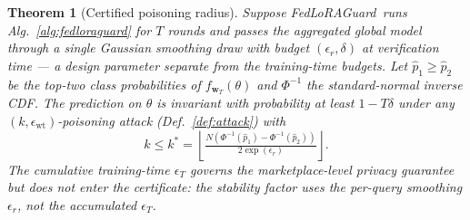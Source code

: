 \documentclass[11pt]{article}
\theoremstyle{plain}
\newtheorem{theorem}{Theorem}
\theoremstyle{definition}
\theoremstyle{remark}
\newcommand{\modelname}{FedLoRAGuard}
\begin{document}
\begin{theorem}[Certified poisoning radius]
\label{thm:certified}
Suppose \modelname\ runs Alg.~\ref{alg:fedloraguard} for $T$
rounds and passes the aggregated global model through a single
Gaussian smoothing draw with budget $(\epsilon_r,\delta)$ at
verification time --- a design parameter separate from the
training-time budgets. Let $\hat{p}_1\!\ge\!\hat{p}_2$ be the
top-two class probabilities of $f_{\mathbf{w}_T}(\theta)$ and
$\Phi^{-1}$ the standard-normal inverse CDF. The prediction on
$\theta$ is invariant with probability at least $1-T\delta$ under
any $(k,\epsilon_{\mathrm{wt}})$-poisoning attack
(Def.~\ref{def:attack}) with
\begin{equation}
k \le k^* = \left\lfloor \tfrac{N (\Phi^{-1}(\hat{p}_1) - \Phi^{-1}(\hat{p}_2))}{2 \exp(\epsilon_r)} \right\rfloor.
\label{eq:kstar}
\end{equation}
The cumulative training-time $\epsilon_T$ governs the
marketplace-level privacy guarantee but does \emph{not} enter the
certificate: the stability factor uses the per-query smoothing
$\epsilon_r$, not the accumulated $\epsilon_T$.
\end{theorem}
\end{document}
